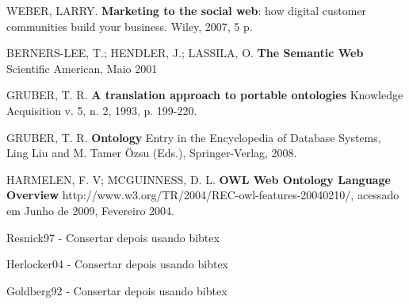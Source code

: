 \begin{thebibliography}{99}

  WEBER, LARRY.
  \textbf{Marketing to the social web}: how digital customer communities build your business.
  Wiley, 2007, 5 p.

  BERNERS-LEE, T.; HENDLER, J.; LASSILA, O.
  \textbf{The Semantic Web}
  Scientific American, Maio 2001

  GRUBER, T. R. 
  \textbf{A translation approach to portable ontologies}
  Knowledge Acquisition
  v. 5, n. 2, 1993, p. 199-220.

  GRUBER, T. R. 
  \textbf{Ontology}
  Entry in the Encyclopedia of Database Systems, Ling Liu and M. Tamer Özsu (Eds.), Springer-Verlag, 2008.

  HARMELEN, F. V; MCGUINNESS, D. L.
  \textbf{OWL Web Ontology Language Overview} 
  http://www.w3.org/TR/2004/REC-owl-features-20040210/, acessado em Junho de 2009, Fevereiro 2004.


   Resnick97 - Consertar depois usando bibtex

   Herlocker04 - Consertar depois usando bibtex



   Goldberg92 - Consertar depois usando bibtex



\end{thebibliography}
